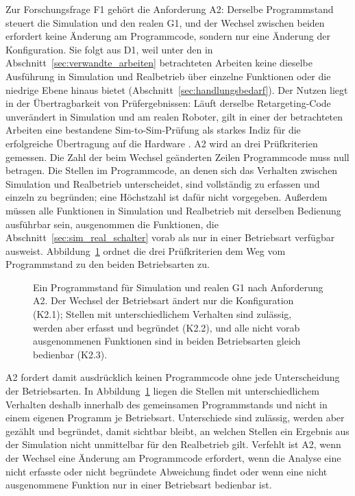 Zur Forschungsfrage F1 gehört die Anforderung A2: Derselbe Programmstand steuert die Simulation und den realen G1, und der Wechsel zwischen beiden erfordert keine Änderung am Programmcode, sondern nur eine Änderung der Konfiguration.
Sie folgt aus D1, weil unter den in Abschnitt~\ref{sec:verwandte_arbeiten} betrachteten Arbeiten keine dieselbe Ausführung in Simulation und Realbetrieb über einzelne Funktionen oder die niedrige Ebene hinaus bietet (Abschnitt~\ref{sec:handlungsbedarf}).
Der Nutzen liegt in der Übertragbarkeit von Prüfergebnissen: Läuft derselbe Retargeting-Code unverändert in Simulation und am realen Roboter, gilt in einer der betrachteten Arbeiten eine bestandene Sim-to-Sim-Prüfung als starkes Indiz für die erfolgreiche Übertragung auf die Hardware \cite{Durrani2026}.
A2 wird an drei Prüfkriterien gemessen.
Die Zahl der beim Wechsel geänderten Zeilen Programmcode muss null betragen. %
Die Stellen im Programmcode, an denen sich das Verhalten zwischen Simulation und Realbetrieb unterscheidet, sind vollständig zu erfassen und einzeln zu begründen; eine Höchstzahl ist dafür nicht vorgegeben. %
Außerdem müssen alle Funktionen in Simulation und Realbetrieb mit derselben Bedienung ausführbar sein, ausgenommen die Funktionen, die Abschnitt~\ref{sec:sim_real_schalter} vorab als nur in einer Betriebsart verfügbar ausweist. %
Abbildung~\ref{fig:programmstand} ordnet die drei Prüfkriterien dem Weg vom Programmstand zu den beiden Betriebsarten zu.

\begin{figure}[htbp]
  \centering
  
  \caption[Ein Programmstand für Simulation und realen G1]{Ein Programmstand für Simulation und realen G1 nach Anforderung A2. Der Wechsel der Betriebsart ändert nur die Konfiguration (K2.1); Stellen mit unterschiedlichem Verhalten sind zulässig, werden aber erfasst und begründet (K2.2), und alle nicht vorab ausgenommenen Funktionen sind in beiden Betriebsarten gleich bedienbar (K2.3).}
  \label{fig:programmstand}
\end{figure}

A2 fordert damit ausdrücklich keinen Programmcode ohne jede Unterscheidung der Betriebsarten.
In Abbildung~\ref{fig:programmstand} liegen die Stellen mit unterschiedlichem Verhalten deshalb innerhalb des gemeinsamen Programmstands und nicht in einem eigenen Programm je Betriebsart.
Unterschiede sind zulässig, werden aber gezählt und begründet, damit sichtbar bleibt, an welchen Stellen ein Ergebnis aus der Simulation nicht unmittelbar für den Realbetrieb gilt.
Verfehlt ist A2, wenn der Wechsel eine Änderung am Programmcode erfordert, wenn die Analyse eine nicht erfasste oder nicht begründete Abweichung findet oder wenn eine nicht ausgenommene Funktion nur in einer Betriebsart bedienbar ist.

